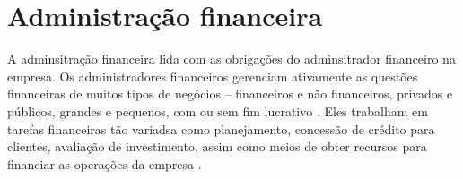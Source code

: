 \chapter{Administração financeira} 

A adminsitração financeira lida com as obrigações do adminsitrador financeiro
na empresa.  Os administradores financeiros gerenciam ativamente as questões
financeiras de muitos tipos de negócios -- financeiros e não financeiros,
privados e públicos, grandes e pequenos, com ou sem fim lucrativo
\cite{gitman2006principios}.  Eles 
trabalham em tarefas financeiras tão variadsa como planejamento, concessão
de crédito para clientes, avaliação de investimento, assim como meios de
obter recursos para financiar as operações da empresa \cite{gitman2008fundamentals}.
